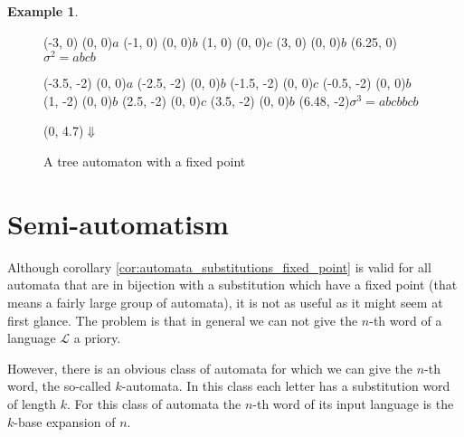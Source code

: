 \documentclass{article}
\theoremstyle{definition}
\newtheorem{example}[theorem]{Example}
\begin{document}
\begin{example}
\begin{figure}[p]
\begin{graph}
  (-3, 0)  (0, 0){$a$} %
  (-1, 0)  (0, 0){$b$}
  (1, 0)  (0, 0){$c$}
  (3, 0)  (0, 0){$b$}
  \freetext(6.25, 0){$\sigma^2 = abcb$}

  (-3.5, -2)  (0, 0){$a$} %
  (-2.5, -2)  (0, 0){$b$}
  (-1.5, -2) (0, 0){$c$}
  (-0.5, -2)  (0, 0){$b$}
  (1, -2)  (0, 0){$b$}
  (2.5, -2)  (0, 0){$c$}
  (3.5, -2)  (0, 0){$b$}
  \freetext(6.48, -2){$\sigma^3 = abcbbcb$}

   
   
  
   
   
   
   

   
   
   
   
   
   
   

  \freetext(0, 4.7){$\Downarrow$}
\end{graph}
\caption{A tree automaton with a fixed point}
\label{fig:automata_tree_fixpoint_substitutions}
\end{figure}
\end{example}

\section{Semi-automatism}
Although corollary \ref{cor:automata_substitutions_fixed_point} is valid for 
all automata that are in bijection with a substitution which have a fixed point
(that means a fairly large group of automata), it is not as useful as it might 
seem at first glance. The problem is that in general we can not give the $n$-th
word of a language $\mathcal{L}$ a priory.

However, there is an obvious class of automata for which we can give the $n$-th
word, the so-called $k$-automata. In this class each letter has a substitution
word of length $k$. For this class of automata the $n$-th word of its input 
language is the $k$-base expansion of $n$.
\end{document}
